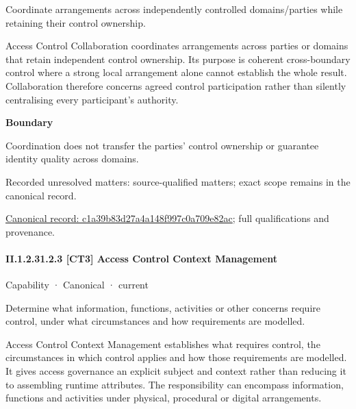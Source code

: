 Coordinate arrangements across independently controlled domains/parties while retaining their control ownership.



Access Control Collaboration coordinates arrangements across parties or domains that retain independent control ownership. Its purpose is coherent cross-boundary control where a strong local arrangement alone cannot establish the whole result. Collaboration therefore concerns agreed control participation rather than silently centralising every participant's authority.



\textbf{Boundary}



Coordination does not transfer the parties' control ownership or guarantee identity quality across domains.


{\small Recorded unresolved matters: source-qualified matters; exact scope remains in the canonical record.}\par
{\footnotesize \href{../../../../continuum/strategy/capability/c1a39b83d27a4a148f997c0a709e82ac.md}{Canonical record: c1a39b83d27a4a148f997c0a709e82ac}; full qualifications and provenance.}\par
\paragraph*{II.1.2.31.2.3 [CT3] Access Control Context Management}
\label{navigation:II.1.2.31.2.3}

\label{element:a51f7a8045d24d0f982320025ba3a6ae}
{\small Capability · Canonical · current}\par

Determine what information, functions, activities or other concerns require control, under what circumstances and how requirements are modelled.



Access Control Context Management establishes what requires control, the circumstances in which control applies and how those requirements are modelled. It gives access governance an explicit subject and context rather than reducing it to assembling runtime attributes. The responsibility can encompass information, functions and activities under physical, procedural or digital arrangements.




